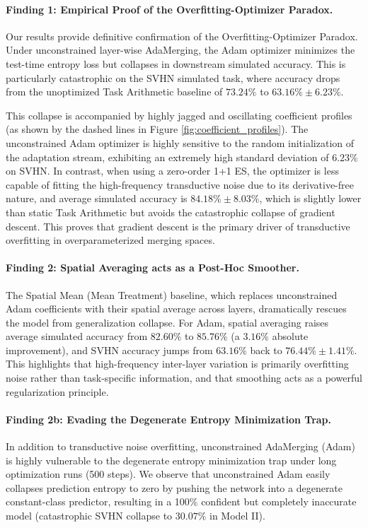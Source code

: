 \paragraph{Finding 1: Empirical Proof of the Overfitting-Optimizer Paradox.} Our results provide definitive confirmation of the Overfitting-Optimizer Paradox. Under unconstrained layer-wise AdaMerging, the Adam optimizer minimizes the test-time entropy loss but collapses in downstream simulated accuracy. This is particularly catastrophic on the SVHN simulated task, where accuracy drops from the unoptimized Task Arithmetic baseline of $73.24\%$ to $63.16\% \pm 6.23\%$. 

This collapse is accompanied by highly jagged and oscillating coefficient profiles (as shown by the dashed lines in Figure \ref{fig:coefficient_profiles}). The unconstrained Adam optimizer is highly sensitive to the random initialization of the adaptation stream, exhibiting an extremely high standard deviation of $6.23\%$ on SVHN. In contrast, when using a zero-order 1+1 ES, the optimizer is less capable of fitting the high-frequency transductive noise due to its derivative-free nature, and average simulated accuracy is $84.18\% \pm 8.03\%$, which is slightly lower than static Task Arithmetic but avoids the catastrophic collapse of gradient descent. This proves that gradient descent is the primary driver of transductive overfitting in overparameterized merging spaces.

\paragraph{Finding 2: Spatial Averaging acts as a Post-Hoc Smoother.} The Spatial Mean (Mean Treatment) baseline, which replaces unconstrained Adam coefficients with their spatial average across layers, dramatically rescues the model from generalization collapse. For Adam, spatial averaging raises average simulated accuracy from $82.60\%$ to $85.76\%$ (a $3.16\%$ absolute improvement), and SVHN accuracy jumps from $63.16\%$ back to $76.44\% \pm 1.41\%$. This highlights that high-frequency inter-layer variation is primarily overfitting noise rather than task-specific information, and that smoothing acts as a powerful regularization principle.

\paragraph{Finding 2b: Evading the Degenerate Entropy Minimization Trap.}
In addition to transductive noise overfitting, unconstrained AdaMerging (Adam) is highly vulnerable to the degenerate entropy minimization trap under long optimization runs (500 steps). We observe that unconstrained Adam easily collapses prediction entropy to zero by pushing the network into a degenerate constant-class predictor, resulting in a 100\% confident but completely inaccurate model (catastrophic SVHN collapse to $30.07\%$ in Model II). 

